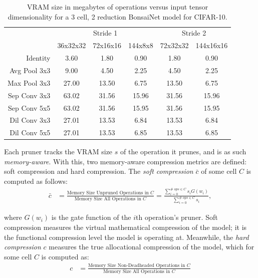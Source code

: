 \begin{table}[h]
\begin{center}
\begin{tabular}{r|c|c|c|c|c}
	& \multicolumn{3}{c|}{Stride 1} & \multicolumn{2}{c}{Stride 2} \\
 & 36x32x32 & 72x16x16 & 144x8x8 & 72x32x32 & 144x16x16 \\
	\hline
Identity & 3.60 & 1.80 & 0.90 & 1.80 & 0.90 \\
Avg Pool 3x3 & 9.00 & 4.50 & 2.25 & 4.50 & 2.25 \\
Max Pool 3x3 & 27.00 & 13.50 & 6.75 & 13.50 & 6.75 \\
Sep Conv 3x3 & 63.02 & 31.56 & 15.96 & 31.56 & 15.96 \\
Sep Conv 5x5 & 63.02 & 31.56 & 15.95 & 31.56 & 15.95 \\
Dil Conv 3x3 & 27.01 & 13.53 & 6.84 & 13.53 & 6.84 \\
Dil Conv 5x5 & 27.01 & 13.53 & 6.85 & 13.53 & 6.85 \\
\end{tabular}
\end{center}
\caption[VRAM size in bytes of operations versus input tensor dimensionality]{VRAM size in megabytes of operations versus input tensor dimensionality for a 3 cell, 2 reduction BonsaiNet
model for CIFAR-10.}
\label{tab:allopcosts}
\end{table}

\newcommand{\softcomp}{\bar{c}}
\newcommand{\hardcomp}{c}

\noindent Each pruner tracks the VRAM size $s$ of the operation it prunes, and is as such \textit{memory-aware}.
With this, two memory-aware compression metrics are defined: soft compression and hard compression.
The \textit{soft compression} $\softcomp$ of some cell $C$ is computed as follows:
\begin{align}
	\softcomp &= \frac{\text{Memory Size Unpruned Operations in } C}{\text{Memory Size All Operations in } C}
	=  \frac{\sum\limits_{i=0}^{\#\;ops \in C}{s_iG(w_i)}}{\sum\limits_{i=0}^{\#\;ops \in C}{s_i}},
\end{align}

\noindent where $G(w_i)$ is the gate function of the $i$th operation's pruner. Soft compression measures the
virtual mathematical compression of the model; it is the functional compression level
the model is operating at. Meanwhile, the \textit{hard compression} $\hardcomp$ measures the true allocational compression
of the model, which for some cell $C$ is computed as:
\begin{align}
	\hardcomp &= \frac{\text{Memory Size Non-Deadheaded Operations in } C}{\text{Memory Size All Operations in } C}
\end{align}

